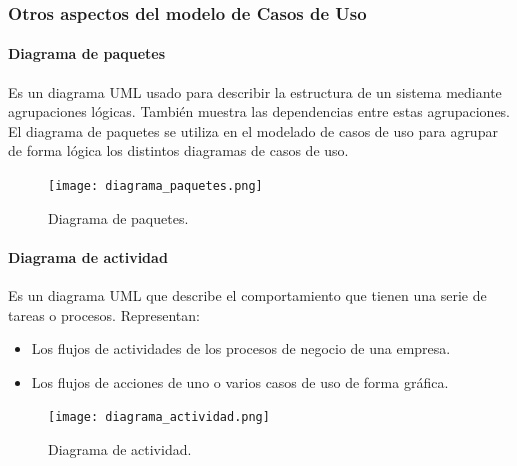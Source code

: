 \documentclass[12pt,spanish]{article}
\begin{document}
\subsubsection{Otros aspectos del modelo de Casos de Uso}

\paragraph{Diagrama de paquetes}
Es un diagrama UML usado para describir la estructura de un sistema mediante agrupaciones lógicas. También muestra las dependencias entre estas agrupaciones.\\
El diagrama de paquetes se utiliza en el modelado de casos de uso para agrupar de forma lógica los distintos diagramas de casos de uso.

\begin{figure}[H]
\centering
\texttt{[image: diagrama\_paquetes.png]}
\caption{Diagrama de paquetes.}
\end{figure}

\paragraph{Diagrama de actividad}

Es un diagrama UML que describe el comportamiento que tienen una serie de tareas o procesos. Representan:
\begin{itemize}
	\item Los flujos de actividades de los procesos de negocio de una empresa.
	\item Los flujos de acciones de uno o varios casos de uso de forma gráfica.
\end{itemize}

\begin{figure}[H]
\centering
\texttt{[image: diagrama\_actividad.png]}
\caption{Diagrama de actividad.}
\end{figure}

\newpage
\end{document}
